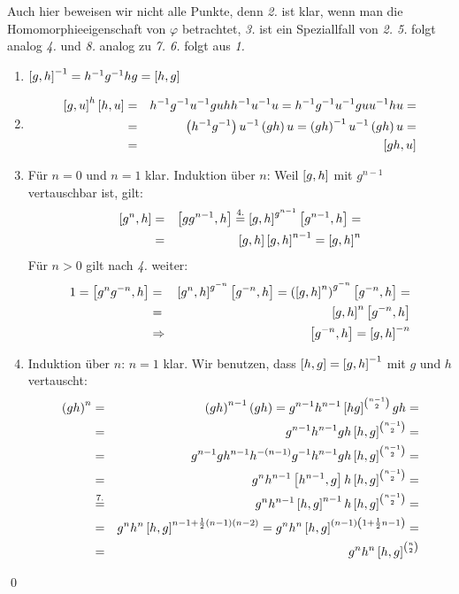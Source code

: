 \begin{beweis}
 Auch hier beweisen wir nicht alle Punkte, denn \emph{2.} ist klar, wenn man die Homomorphieeigenschaft von $\varphi$ betrachtet, \emph{3.} ist ein Speziallfall von \emph{2. 5.} folgt analog \emph{4.} und \emph{8.} analog zu \emph{7. 6.} folgt aus \emph{1.}
 \begin{enumerate}
  \item $\left[g,h\right]^{-1} = h^{-1}g^{-1}hg=\left[h,g\right]$
  \setcounter{enumi}{3}
  \item
   \begin{eqnarray*}
    \left[g,u\right]^h\left[h,u\right]&=&h^{-1}g^{-1}u^{-1}guhh^{-1}u^{-1}u=h^{-1}g^{-1}u^{-1}guu^{-1}hu=\\&=&\left(h^{-1}g^{-1}\right)u^{-1}\left(gh\right)u=\left(gh\right)^{-1}u^{-1}\left(gh\right)u=\\&=&\left[gh,u\right]
   \end{eqnarray*}
  \setcounter{enumi}{6}
  \item F\"ur $n=0$ und $n=1$ klar. Induktion \"uber $n$: Weil $\left[g,h\right]$ mit $g^{n-1}$ vertauschbar ist, gilt:
   \begin{eqnarray*}
    \left[g^n,h\right]&=&\left[gg^{n-1},h\right]\stackrel{4.}{=}\left[g,h\right]^{g^{n-1}}\left[g^{n-1},h\right]=\\&=&\left[g,h\right]\left[g,h\right]^{n-1}=\left[g,h\right]^n
   \end{eqnarray*}
  F\"ur $n>0$ gilt nach \emph{4.} weiter:
   \begin{eqnarray*}
    1=\left[g^ng^{-n},h\right]&=&\left[g^n,h\right]^{g^{-n}}\left[g^{-n},h\right]=\left(\left[g,h\right]^n\right)^{g^{-n}}\left[g^{-n},h\right]=\\&=&\left[g,h\right]^n\left[g^{-n},h\right]\\&\Rightarrow& \left[g^{-n},h\right]=\left[g,h\right]^{-n}
   \end{eqnarray*}
  \setcounter{enumi}{8}
  \item Induktion \"uber $n$: $n=1$ klar. Wir benutzen, dass $\left[h,g\right]=\left[g,h\right]^{-1}$ mit $g$ und $h$ vertauscht:
   \begin{eqnarray*}
    \left(gh\right)^n&=&\left(gh\right)^{n-1}\left(gh\right)=g^{n-1}h^{n-1}\left[hg\right]^{\binom{n-1}{2}}gh=\\&=&g^{n-1}h^{n-1}gh\left[h,g\right]^{\binom{n-1}{2}}=\\&=&g^{n-1}gh^{n-1}h^{-\left(n-1\right)}g^{-1}h^{n-1}gh\left[h,g\right]^{\binom{n-1}{2}}=\\&=&g^nh^{n-1}\left[h^{n-1},g\right]h\left[h,g\right]^{\binom{n-1}{2}}=\\&\stackrel{7.}{=}&g^nh^{n-1}\left[h,g\right]^{n-1}h\left[h,g\right]^{\binom{n-1}{2}}=\\&=&g^nh^n\left[h,g\right]^{n-1+\frac{1}{2}\left(n-1\right)\left(n-2\right)}=g^nh^n\left[h,g\right]^{\left(n-1\right)\left(1+\frac{1}{2}n-1\right)}=\\&=&g^nh^n\left[h,g\right]^{\binom{n}{2}}
   \end{eqnarray*}
 \end{enumerate}
 \qed
\end{beweis}

